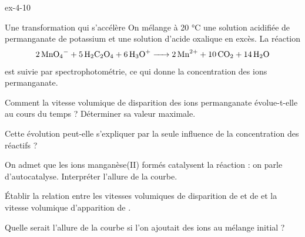 \begin{blocLivre}{ex-4-10}
\begin{exercice}[2]{Une transformation qui s'accélère}
On mélange à 20 °C une solution acidifiée de permanganate de potassium et une solution d'acide oxalique
 en excès. La réaction
\[\ce{2 MnO4- + 5 H2C2O4 + 6 H3O+ -> 2 Mn^2+ + 10 CO2 + 14 H2O}\]
est suivie par spectrophotométrie, ce qui donne la concentration des ions permanganate.
\begin{questions}
\item Comment la vitesse volumique de disparition des ions permanganate évolue-t-elle au cours du temps ? Déterminer
sa valeur maximale.
\item Cette évolution peut-elle s'expliquer par la seule influence de la concentration des réactifs ?
\item On admet que les ions manganèse(II) formés catalysent la réaction : on parle d'autocatalyse. Interpréter
l'allure de la courbe.
\item Établir la relation entre les vitesses volumiques de disparition de  et de  et la vitesse
volumique d'apparition de .
\item Quelle serait l'allure de la courbe si l'on ajoutait des ions  au mélange initial ?
\end{questions}
\end{exercice}
\end{blocLivre}
